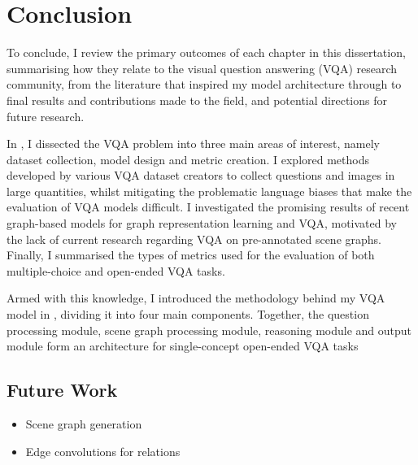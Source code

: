 \chapter{Conclusion}

To conclude, I review the primary outcomes of each chapter in this dissertation, summarising how they relate to the visual question answering (VQA) research community, from the literature that inspired my model architecture through to final results and contributions made to the field, and potential directions for future research.

In \chapterautorefname{ \ref{chapter:literature}}, I dissected the VQA problem into three main areas of interest, namely dataset collection, model design and metric creation. I explored methods developed by various VQA dataset creators to collect questions and images in large quantities, whilst mitigating the problematic language biases that make the evaluation of VQA models difficult. I investigated the promising results of recent graph-based models for graph representation learning and VQA, motivated by the lack of current research regarding VQA on pre-annotated scene graphs. Finally, I summarised the types of metrics used for the evaluation of both multiple-choice and open-ended VQA tasks.

Armed with this knowledge, I introduced the methodology behind my VQA model in \chapterautorefname{ \ref{chapter:methodology}}, dividing it into four main components. Together, the question processing module, scene graph processing module, reasoning module and output module form an architecture for single-concept open-ended VQA tasks

\section{Future Work}

\begin{itemize}
  \item Scene graph generation
  \item Edge convolutions for relations
\end{itemize}
